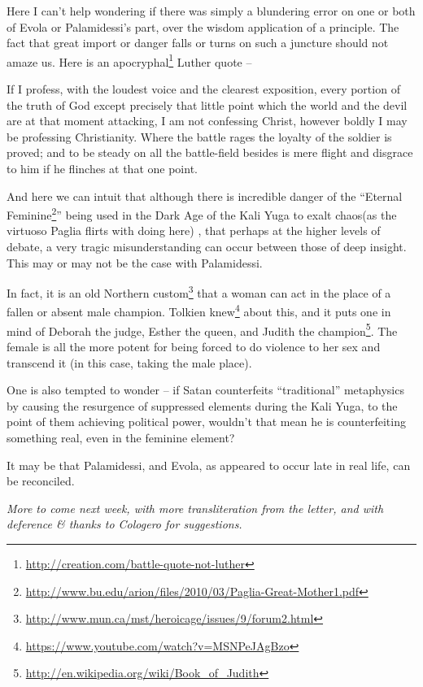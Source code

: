 Here I can't help wondering if there was simply a blundering error on one or both of Evola or Palamidessi's part, over the wisdom application of a principle. The fact that great import or danger falls or turns on such a juncture should not amaze us. Here is an apocryphal\footnote{\url{http://creation.com/battle-quote-not-luther}} Luther quote --

\begin{quotex}
If I profess, with the loudest voice and the clearest exposition, every portion of the truth of God except precisely that little point which the world and the devil are at that moment attacking, I am not confessing Christ, however boldly I may be professing Christianity. Where the battle rages the loyalty of the soldier is proved; and to be steady on all the battle-field besides is mere flight and disgrace to him if he flinches at that one point.
\end{quotex}


And here we can intuit that although there is incredible danger of the ``Eternal Feminine\footnote{\url{http://www.bu.edu/arion/files/2010/03/Paglia-Great-Mother1.pdf}}'' being used in the Dark Age of the Kali Yuga to exalt chaos(as the virtuoso Paglia flirts with doing here) , that perhaps at the higher levels of debate, a very tragic misunderstanding can occur between those of deep insight. This may or may not be the case with Palamidessi.

In fact, it is an old Northern custom\footnote{\url{http://www.mun.ca/mst/heroicage/issues/9/forum2.html}} that a woman can act in the place of a fallen or absent male champion. Tolkien knew\footnote{\url{https://www.youtube.com/watch?v=MSNPeJAgBzo}} about this, and it puts one in mind of Deborah the judge, Esther the queen, and Judith the champion\footnote{\url{http://en.wikipedia.org/wiki/Book_of_Judith}}. The female is all the more potent for being forced to do violence to her sex and transcend it (in this case, taking the male place).

One is also tempted to wonder -- if Satan counterfeits ``traditional'' metaphysics by causing the resurgence of suppressed elements during the Kali Yuga, to the point of them achieving political power, wouldn't that mean he is counterfeiting something real, even in the feminine element?

It may be that Palamidessi, and Evola, as appeared to occur late in real life, can be reconciled.

\emph{More to come next week, with more transliteration from the letter, and with deference \& thanks to Cologero for suggestions.}


